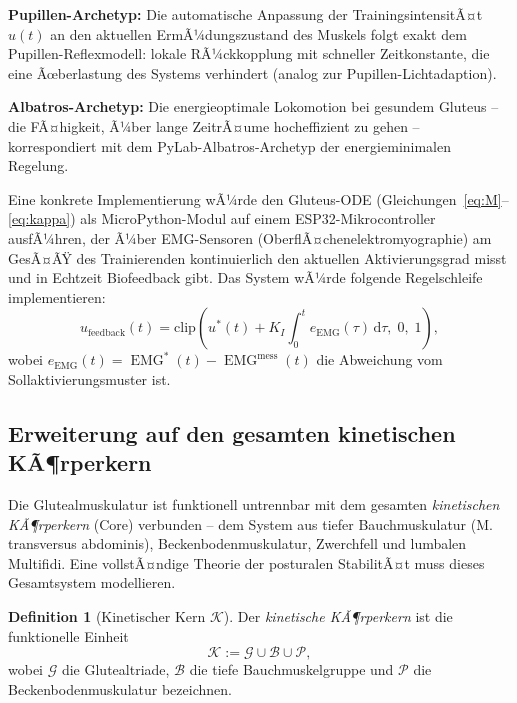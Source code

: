 ﻿\documentclass[12pt,a4paper]{report}
\theoremstyle{plain}
\theoremstyle{definition}
\newtheorem{definition}[theorem]{Definition}
\theoremstyle{remark}
\DeclareMathOperator{\EMG}{EMG}
\begin{document}
	\textbf{Pupillen-Archetyp:}
	Die automatische Anpassung der TrainingsintensitÃ¤t $u(t)$ an den
	aktuellen ErmÃ¼dungszustand des Muskels folgt exakt dem
	Pupillen-Reflexmodell: lokale RÃ¼ckkopplung mit schneller Zeitkonstante,
	die eine Ãœberlastung des Systems verhindert (analog zur Pupillen-Lichtadaption).
	
	\textbf{Albatros-Archetyp:}
	Die energieoptimale Lokomotion bei gesundem Gluteus -- die FÃ¤higkeit,
	Ã¼ber lange ZeitrÃ¤ume hocheffizient zu gehen -- korrespondiert mit dem
	PyLab-Albatros-Archetyp der energieminimalen Regelung.
	
	Eine konkrete Implementierung wÃ¼rde den Gluteus-ODE (Gleichungen~\eqref{eq:M}--\eqref{eq:kappa})
	als MicroPython-Modul auf einem ESP32-Mikrocontroller ausfÃ¼hren,
	der Ã¼ber EMG-Sensoren (OberflÃ¤chenelektromyographie) am GesÃ¤ÃŸ des
	Trainierenden kontinuierlich den aktuellen Aktivierungsgrad misst
	und in Echtzeit Biofeedback gibt. Das System wÃ¼rde folgende
	Regelschleife implementieren:
	\[
	u_{\mathrm{feedback}}(t) = \mathrm{clip}\!\left(
	u^*(t) + K_I \int_0^t e_{\EMG}(\tau)\,\mathrm{d}\tau,\; 0,\; 1\right),
	\]
	wobei $e_{\EMG}(t) = \EMG^*(t) - \EMG^{\mathrm{mess}}(t)$ die Abweichung
	vom Sollaktivierungsmuster ist.
	
	\subsection{Erweiterung auf den gesamten kinetischen KÃ¶rperkern}
	\label{subsec:kern}
	
	Die Glutealmuskulatur ist funktionell untrennbar mit dem gesamten
	\emph{kinetischen KÃ¶rperkern} (Core) verbunden -- dem System aus
	tiefer Bauchmuskulatur (M. transversus abdominis), Beckenbodenmuskulatur,
	Zwerchfell und lumbalen Multifidi. Eine vollstÃ¤ndige Theorie der
	posturalen StabilitÃ¤t muss dieses Gesamtsystem modellieren.
	
	\begin{definition}[Kinetischer Kern $\mathcal{K}$]
		\label{def:kern}
		Der \emph{kinetische KÃ¶rperkern} ist die funktionelle Einheit
		\[
		\mathcal{K} := \mathcal{G} \cup \mathcal{B} \cup \mathcal{P},
		\]
		wobei $\mathcal{G}$ die Glutealtriade, $\mathcal{B}$ die tiefe
		Bauchmuskelgruppe und $\mathcal{P}$ die Beckenbodenmuskulatur bezeichnen.
	\end{definition}
	
\end{document}
